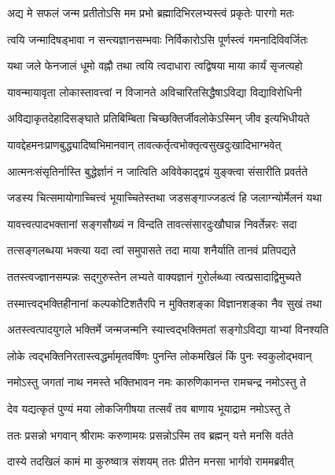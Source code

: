 \twolineshloka
{अद्य मे सफलं जन्म प्रतीतोऽसि मम प्रभो}
{ब्रह्मादिभिरलभ्यस्त्वं प्रकृतेः पारगो मतः} %

\twolineshloka
{त्वयि जन्मादिषड्भावा न सन्त्यज्ञानसम्भवाः}
{निर्विकारोऽसि पूर्णस्त्वं गमनादिविवर्जितः} %

\twolineshloka
{यथा जले फेनजालं धूमो वह्नौ तथा त्वयि}
{त्वदाधारा त्वद्विषया माया कार्यं सृजत्यहो} %

\twolineshloka
{यावन्मायावृता लोकास्तावत्त्वां न विजानते}
{अविचारितसिद्धैषाऽविद्या विद्याविरोधिनी} %

\twolineshloka
{अविद्याकृतदेहादिसङ्घाते प्रतिबिम्बिता}
{चिच्छक्तिर्जीवलोकेऽस्मिन् जीव इत्यभिधीयते} %

\twolineshloka
{यावद्देहमनःप्राणबुद्ध्यादिष्वभिमानवान्}
{तावत्कर्तृत्वभोक्तृत्वसुखदुःखादिभाग्भवेत्} %

\twolineshloka
{आत्मनःसंसृतिर्नास्ति बुद्धेर्ज्ञानं न जात्विति}
{अविवेकाद्द्वयं युङ्क्त्वा संसारीति प्रवर्तते} %

\twolineshloka
{जडस्य चित्समायोगाच्चित्त्वं भूयाच्चितेस्तथा}
{जडसङ्गाज्जडत्वं हि जलाग्न्योर्मेलनं यथा} %

\twolineshloka
{यावत्त्वत्पादभक्तानां सङ्गसौख्यं न विन्दति}
{तावत्संसारदुःखौघान्न निवर्तेन्नरः सदा} %

\twolineshloka
{तत्सङ्गलब्धया भक्त्या यदा त्वां समुपासते}
{तदा माया शनैर्याति तानवं प्रतिपद्यते} %

\twolineshloka
{ततस्त्वज्ज्ञानसम्पन्नः सद्गुरुस्तेन लभ्यते}
{वाक्यज्ञानं गुरोर्लब्ध्वा त्वत्प्रसादाद्विमुच्यते} %

\twolineshloka
{तस्मात्त्वद्भक्तिहीनानां कल्पकोटिशतैरपि}
{न मुक्तिशङ्का विज्ञानशङ्का नैव सुखं तथा} %

\twolineshloka
{अतस्त्वत्पादयुगले भक्तिर्मे जन्मजन्मनि}
{स्यात्त्वद्भक्तिमतां सङ्गोऽविद्या याभ्यां विनश्यति} %

\twolineshloka
{लोके त्वद्भक्तिनिरतास्त्वद्धर्मामृतवर्षिणः}
{पुनन्ति लोकमखिलं किं पुनः स्वकुलोद्भवान्} %

\twolineshloka
{नमोऽस्तु जगतां नाथ नमस्ते भक्तिभावन}
{नमः कारुणिकानन्त रामचन्द्र नमोऽस्तु ते} %

\twolineshloka
{देव यद्यत्कृतं पुण्यं मया लोकजिगीषया}
{तत्सर्वं तव बाणाय भूयाद्राम नमोऽस्तु ते} %

\twolineshloka
{ततः प्रसन्नो भगवान् श्रीरामः करुणामयः}
{प्रसन्नोऽस्मि तव ब्रह्मन् यत्ते मनसि वर्तते} %

\twolineshloka
{दास्ये तदखिलं कामं मा कुरुष्वात्र संशयम्}
{ततः प्रीतेन मनसा भार्गवो राममब्रवीत्} %

